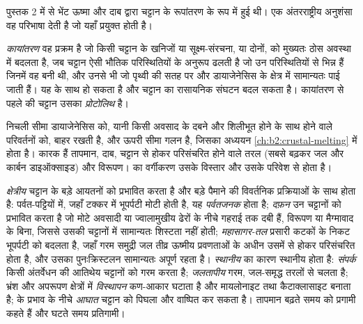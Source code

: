 पुस्तक 2 में  से भेंट ऊष्मा और दाब द्वारा चट्टान के रूपांतरण के रूप में हुई थी।
एक अंतरराष्ट्रीय अनुशंसा वह परिभाषा देती है जो यहाँ प्रयुक्त होती है।

\begin{definition}[कायांतरण; प्रोटोलिथ]\label{def:b2:metamorphic-facies:metamorphism}
\emph{कायांतरण} वह प्रक्रम है जो किसी चट्टान के खनिजों या
सूक्ष्म-संरचना, या दोनों, को मुख्यतः ठोस अवस्था में बदलता है, जब चट्टान ऐसी भौतिक परिस्थितियों के
अनुरूप ढलती है जो उन परिस्थितियों से भिन्न हैं जिनमें वह बनी थी, और उनसे भी जो
पृथ्वी की सतह पर और डायाजेनेसिस के क्षेत्र में सामान्यतः पाई जाती हैं। यह
 के साथ हो सकता है और चट्टान का रासायनिक संघटन बदल सकता है। कायांतरण से पहले की
चट्टान उसका \emph{प्रोटोलिथ} है।
\end{definition}

निचली सीमा डायाजेनेसिस को, यानी किसी अवसाद के दबने और शिलीभूत होने के साथ होने वाले परिवर्तनों को,
बाहर रखती है, और ऊपरी सीमा गलन है, जिसका अध्ययन \cref{ch:b2:crustal-melting} में होता है।
कारक हैं तापमान, दाब, चट्टान से होकर परिसंचरित होने वाले तरल (सबसे बढ़कर जल और
कार्बन डाइऑक्साइड) और विरूपण।  का वर्गीकरण उसके विस्तार और
उसके परिवेश से होता है।

\emph{क्षेत्रीय}  चट्टान के बड़े आयतनों को प्रभावित करता है और बड़े पैमाने की
विवर्तनिक प्रक्रियाओं के साथ होता है: पर्वत-पट्टियों में, जहाँ टक्कर में भूपर्पटी मोटी होती है, यह \emph{पर्वतजनक} होता है;
\emph{दफ़न}  उन चट्टानों को प्रभावित करता है जो मोटे अवसादी या ज्वालामुखीय ढेरों के नीचे गहराई तक दबी हैं,
विरूपण या मैग्मावाद के बिना, जिससे उसकी चट्टानों में
सामान्यतः शिस्टता नहीं होती; \emph{महासागर-तल}  प्रसारी कटकों के निकट भूपर्पटी को
बदलता है, जहाँ गरम समुद्री जल तीव्र ऊष्मीय प्रवणताओं के अधीन उसमें से होकर परिसंचरित होता है,
और उसका पुनःक्रिस्टलन सामान्यतः अपूर्ण रहता है। \emph{स्थानीय} 
का कारण स्थानीय होता है: \emph{संपर्क}  किसी अंतर्वेधन की आतिथेय चट्टानों को गरम करता है;
\emph{जलतापीय}  गरम, जल-समृद्ध तरलों से चलता है;
भ्रंश और अपरूपण क्षेत्रों में \emph{विस्थापन}  कण-आकार घटाता है और
मायलोनाइट तथा कैटाक्लासाइट बनाता है;  के प्रभाव के नीचे \emph{आघात} 
चट्टान को पिघला और वाष्पित कर सकता है। तापमान बढ़ते समय  को प्रगामी कहते हैं और
घटते समय प्रतिगामी।


